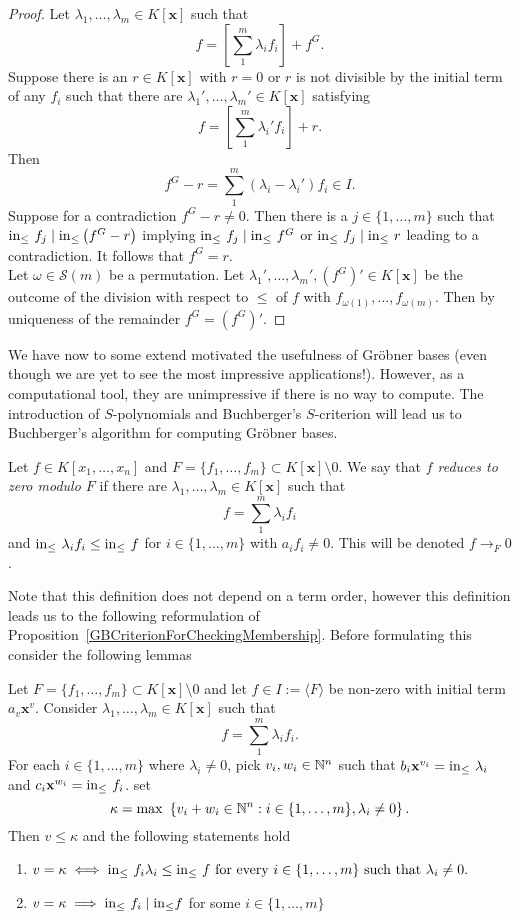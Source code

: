 \begin{proof}
    Let $\lambda_1,\dots,\lambda_m\in K[\mathbf{x}]$ such that 
    $$f= \left[\sum_1^m \lambda_if_i\right] + f^G.$$
    Suppose there is an $r\in K[\mathbf{x}]$ with $r=0$ or $r$ is not divisible by the initial term of any $f_i$ such that there are $\lambda_1',\dots,\lambda_m'\in K[\mathbf{x}]$ satisfying 
    $$f = \left[\sum_1^m\lambda_i'f_i\right] + r.$$
    Then 
    $$f^G-r = \sum_1^m (\lambda_i-\lambda_i')f_i\in I.$$
    Suppose for a contradiction $f^G-r\neq 0$. Then there is a $j\in\{1,\dots,m\}$ such that $\mathrm{in}_\leq\ f_j \mid \mathrm{in}_\leq\left(f^G-r\right)$ implying $\inn\ f_j \mid \inn\ f^G$ or $\mathrm{in}_\leq\ f_j\mid \mathrm{in}_\leq\ r$ leading to a contradiction. It follows that $f^G =r$.\\
    Let $\omega \in \mathcal{S}(m)$ be a permutation. 
    Let $\lambda_1',\dots,\lambda_m',(f^G)'\in K[\mathbf{x}]$ be the 
    outcome of the division with respect to $\leq$ of $f$ with $f_{\omega(1)},\dots,f_{\omega(m)}$. Then by uniqueness of the remainder $f^G=(f^G)'$.
\end{proof}
 We have now to some extend motivated the usefulness of Gröbner bases (even though we are yet to see the most impressive applications!). However, as a computational tool, they are unimpressive if there is no way to compute. The introduction of $S$-polynomials and Buchberger's $S$-criterion will lead us to Buchberger's algorithm for computing Gröbner bases.
\begin{definition}
    Let $f\in K[x_1,\dots,x_n]$ and $F=\{f_1,\dots,f_m\}\subset K[\mathbf{x}]\setminus 0$. We say that \textit{$f$ reduces to zero modulo $F$} if there are $\lambda_1,\dots,\lambda_m\in K[\mathbf{x}]$ such that 
    $$f = \sum_1^m \lambda_if_i$$
    and $\mathrm{in}_\leq\ \lambda_if_i \leq \mathrm{in}_\leq\ f$ for $i\in\{1,\dots,m\}$ with $a_if_i\neq 0$. This will be denoted $f\to_F 0$.
\end{definition}
Note that this definition does not depend on a term order, however this definition leads us to the following reformulation of Proposition~\ref{GBCriterionForCheckingMembership}. Before formulating this consider the following lemmas 
\begin{lemma}\label{ConditionsForVanishingInitialTerms}
    Let $F=\{f_1,\dots,f_m\}\subset K[\mathbf{x}]\setminus 0$ and let $f \in I:=\langle F\rangle$ be non-zero with initial term $a_v\mathbf{x}^v$. Consider $\lambda_1,\dots,\lambda_m\in K[\mathbf{x}]$ such that 
    $$f=\sum_1^m \lambda_if_i.$$
    For each $i\in\{1,\dots,m\}$ where $\lambda_i\neq 0$, pick $v_i,w_i\in\mathbb{N}^n$ such that $b_{i}\mathbf{x}^{v_i}= \mathrm{in}_\leq\ \lambda_i$ and $c_{i}\mathbf{x}^{w_i}=\mathrm{in}_\leq\ f_i$. set 
    $$\kappa = \max\ \left\{v_i+w_i\in\mathbb{N}^n : i\in\{1,\dots,m\},\lambda_i\neq0 \right\}.$$
    Then $v\leq \kappa$ and the following statements hold
    \begin{enumerate}
        \item $v = \kappa \iff \mathrm{in}_\leq\ f_i\lambda_i \leq \mathrm{in}_\leq\ f \text{ for every } i\in\{1,\dots,m\} \text{ such that } \lambda_i\neq 0.$
        \item $v = \kappa \implies \mathrm{in}_\leq\ f_i \mid \mathrm{in}_\leq f$ for some $i\in\{1,\dots,m\}$
    \end{enumerate}
\end{lemma}
